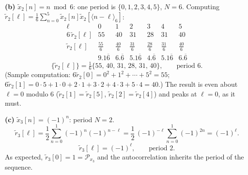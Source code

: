 \textbf{(b)} $\tilde{x}_2[n]=n \bmod 6$: one period is $\{0,1,2,3,4,5\}$, $N=6$. Computing
$\tilde{r}_2[\ell]=\tfrac16\sum_{n=0}^{5}\tilde x_2[n]\tilde x_2[\langle n-\ell\rangle_6]$:
\[
\begin{array}{r|cccccc}
\ell & 0 & 1 & 2 & 3 & 4 & 5\\\hline
6\,\tilde{r}_2[\ell] & 55 & 40 & 31 & 28 & 31 & 40\\[2pt]
\tilde{r}_2[\ell] & \frac{55}{6} & \frac{40}{6} & \frac{31}{6} & \frac{28}{6} & \frac{31}{6} & \frac{40}{6}\\[2pt]
 & 9.1\overline{6} & 6.\overline{6} & 5.1\overline{6} & 4.\overline{6} & 5.1\overline{6} & 6.\overline{6}
\end{array}
\]
\[
\boxed{\;\{\tilde{r}_2[\ell]\}=\tfrac16\{55,\,40,\,31,\,28,\,31,\,40\},\qquad\text{period }6 .\;}
\]
(Sample computation: $6\tilde r_2[0]=0^2+1^2+\cdots+5^2=55$;
$6\tilde r_2[1]=0\cdot5+1\cdot0+2\cdot1+3\cdot2+4\cdot3+5\cdot4=40$.)
The result is even about $\ell=0$ modulo 6 ($\tilde r_2[1]=\tilde r_2[5]$,
$\tilde r_2[2]=\tilde r_2[4]$) and peaks at $\ell=0$, as it must.

\textbf{(c)} $\tilde{x}_3[n]=(-1)^{n}$: period $N=2$.
\[
\tilde{r}_3[\ell]=\frac12\sum_{n=0}^{1}(-1)^{n}(-1)^{n-\ell}
=\frac12\,(-1)^{-\ell}\sum_{n=0}^{1}(-1)^{2n}=(-1)^{\ell}.
\]
\[
\boxed{\;\tilde{r}_3[\ell]=(-1)^{\ell},\qquad\text{period }2 .\;}
\]
As expected, $\tilde r_3[0]=1=\mathcal{P}_{x_3}$ and the autocorrelation inherits the period
of the sequence.
